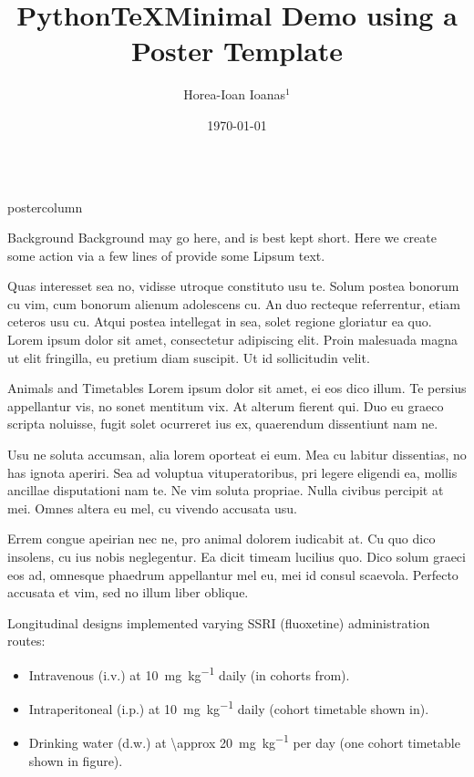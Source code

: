 \documentclass{beamer}
\title{Python\TeX Minimal Demo using a Poster Template}
\author{Horea-Ioan Ioanas$^{1}$}
\institute[ETH]{$^{1}$Institute for Biomedical Engineering, ETH and University of Zurich}
\date{\today}
\newlength{\columnheight}
\begin{document}
\begin{frame}
\begin{columns}
	\begin{column}{.43\textwidth}
		\begin{beamercolorbox}[center]{postercolumn}
			\begin{minipage}{.98\textwidth}  %
				\parbox[t][\columnheight]{\textwidth}{ %
					\begin{myblock}{Background}
						Background may go here, and is best kept short.
						Here we create some action via a few lines of provide some Lipsum text.

						\vspace{0.8em}

						Quas interesset sea no, vidisse utroque constituto usu te.
						Solum postea bonorum cu vim, cum bonorum alienum adolescens cu. 
						An duo recteque referrentur, etiam ceteros usu cu.
						Atqui postea intellegat in sea, solet regione gloriatur ea quo.
						Lorem ipsum dolor sit amet, consectetur adipiscing elit.
						Proin malesuada magna ut elit fringilla, eu pretium diam suscipit. Ut id sollicitudin velit.
					\end{myblock}\vfill
					\vspace{-0.3em}
					\begin{myblock}{Animals and Timetables}
						Lorem ipsum dolor sit amet, ei eos dico illum.
						Te persius appellantur vis, no sonet mentitum vix.
						At alterum fierent qui.
						Duo eu graeco scripta noluisse, fugit solet ocurreret ius ex, quaerendum dissentiunt nam ne.

						Usu ne soluta accumsan, alia lorem oporteat ei eum.
						Mea cu labitur dissentias, no has ignota aperiri.
						Sea ad voluptua vituperatoribus, pri legere eligendi ea, mollis ancillae disputationi nam te. Ne vim soluta propriae.
						Nulla civibus percipit at mei. Omnes altera eu mel, cu vivendo accusata usu.

						Errem congue apeirian nec ne, pro animal dolorem iudicabit at.
						Cu quo dico insolens, cu ius nobis neglegentur.
						Ea dicit timeam lucilius quo. Dico solum graeci eos ad, omnesque phaedrum appellantur mel eu, mei id consul scaevola.
						Perfecto accusata et vim, sed no illum liber oblique.

						\vspace{0.6em}
						Longitudinal designs implemented varying SSRI (fluoxetine) administration routes:
						\begin{itemize}
							\item Intravenous (i.v.) at \SI{10}{\mg\per\kg} daily (in cohorts from).
							\item Intraperitoneal (i.p.) at \SI{10}{\mg\per\kg} daily (cohort timetable shown in).
							\item Drinking water (d.w.) at \SI{\approx 20}{\milli\gram\per\kilo\gram} per day (one cohort timetable shown in figure).
						\end{itemize}


\end{myblock}}
\end{minipage}
\end{beamercolorbox}
\end{column}
\end{columns}
\end{frame}
\end{document}

